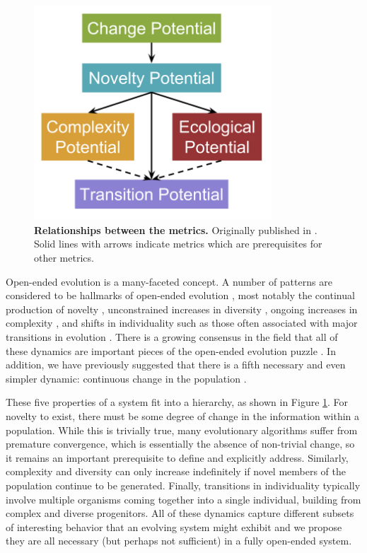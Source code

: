 \documentclass[letterpaper]{article}
\begin{document}
\begin{figure}
\includegraphics[width=3.5in]{figs/Complexity_Barriers.png}
\caption{\textbf{Relationships between the metrics.} Originally published in \citep{blogpost}. Solid lines with arrows indicate metrics which are prerequisites for other metrics.}
\label{hierarchy}
\end{figure}

Open-ended evolution is a many-faceted concept. A number of patterns are considered to be hallmarks of open-ended evolution \citep{taylor_open-ended_2016}, most notably the continual production of novelty \citep{lehman_abandoning_2011, banzhaf_defining_2016}, unconstrained increases in diversity \citep{bedau1994bifurcation}, ongoing increases in complexity \citep{Lenski:2003vy, Korb:2011kg}, and shifts in individuality such as those often associated with major transitions in evolution \citep{smith1997major}. There is a growing consensus in the field that all of these dynamics are important pieces of the open-ended evolution puzzle \citep{taylor_open-ended_2016}. In addition, we have previously suggested that there is a fifth necessary and even simpler dynamic: continuous change in the population \citep{blogpost}.


These five properties of a system fit into a hierarchy, as shown in Figure \ref{hierarchy}. For novelty to exist, there must be some degree of change in the information within a population. While this is trivially true, many evolutionary algorithms suffer from premature convergence, which is essentially the absence of non-trivial change, so it remains an important prerequisite to define and explicitly address. Similarly, complexity and diversity can only increase indefinitely if novel members of the population continue to be generated. Finally, transitions in individuality typically involve multiple organisms coming together into a single individual, building from complex and diverse progenitors.  All of these dynamics capture different subsets of interesting behavior that an evolving system might exhibit and we propose they are all necessary (but perhaps not sufficient) in a fully open-ended system.
\end{document}
